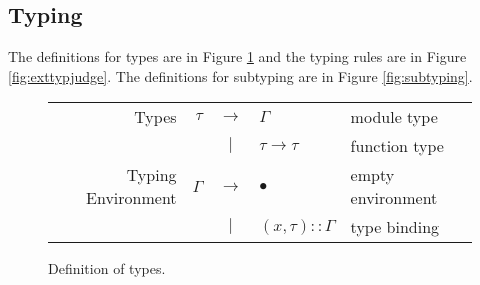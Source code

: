 \documentclass{article}
\theoremstyle{definition}
\newcommand*{\vbar}{|}
\newcommand*{\cons}{::}
\begin{document}
\subsection{Typing}
The definitions for types are in Figure \ref{fig:exttypdom} and the typing rules are in Figure \ref{fig:exttypjudge}.
The definitions for subtyping are in Figure \ref{fig:subtyping}.

\begin{figure}[h!]
	\centering
	\begin{tabular}{rrcll}
		Types              & $\tau$   & $\rightarrow$ & $\Gamma$               & module type       \\
		                   &          & $\vbar$       & $\tau\rightarrow\tau$  & function type     \\
		Typing Environment & $\Gamma$ & $\rightarrow$ & $\bullet$              & empty environment \\
		                   &          & $\vbar$       & $(x,\tau)\cons \Gamma$ & type binding
	\end{tabular}
	\caption{Definition of types.}
	\label{fig:exttypdom}
\end{figure}
\end{document}
